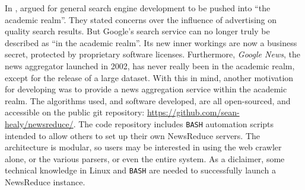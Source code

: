 In , \citeauthor{page1998} argued for general
search engine development to be pushed into ``the academic realm''.  They
stated concerns over the influence of advertising on quality search
results.  But Google's search service can no longer truly be described as
``in the academic realm''.  Its new inner workings are now a business
secret, protected by proprietary software licenses. Furthermore,
{\it Google News}, the news
aggregator launched in 2002, has never really been in the academic
realm, except for the release of a large dataset.  With this in mind,
another motivation for developing \nr{} was to provide
a news aggregation service within the academic realm.  The algorithms
used, and software developed, are all open-sourced, and accessible
on the public git repository: \url{https://github.com/sean-healy/newsreduce/}.  The code
repository includes {\tt BASH} automation
scripts intended to allow others to set up their own NewsReduce
servers.  The architecture is modular, so users may be interested in
using the web crawler alone, or the various parsers, or even the entire
system. As a diclaimer, some technical knowledge in Linux and
{\tt BASH} are needed to successfully launch a NewsReduce instance.